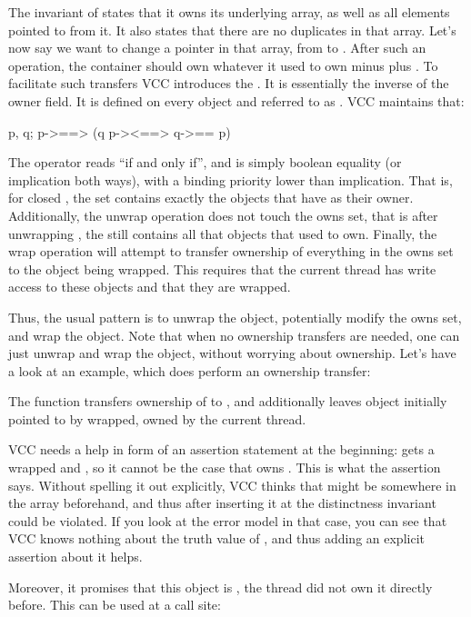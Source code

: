 
\noindent
The invariant of  states that it owns its underlying array,
as well as all elements pointed to from it.
It also states that there are no duplicates in that array.
Let's now say we want to change a pointer in that array,
from  to .
After such an operation, the container should own whatever it used
to own minus  plus .
To facilitate such transfers VCC introduces the .
It is essentially the inverse of the owner field.
It is defined on every object  and referred to as .
VCC maintains that:
\begin{VCC}
\forall \object p, q; p->\closed ==> 
  (q \in p->\owns <==> q->\owner == p)
\end{VCC}
The operator \vcc{<==>} reads ``if and only if'', and is simply boolean
equality (or implication both ways), with a binding priority lower than implication.
That is, for closed , the set  contains exactly
the objects that have  as their owner.
Additionally, the unwrap operation does not touch the owns set,
that is after unwrapping , the  still contains
all that objects that  used to own.
Finally, the wrap operation will attempt to transfer ownership
of everything in the owns set to the object being wrapped.
This requires that the current thread has write access to these objects
and that they are wrapped.

Thus, the usual pattern is to unwrap the object, potentially modify the owns
set, and wrap the object.
Note that when no ownership transfers are needed, one can just unwrap
and wrap the object, without worrying about ownership.
Let's have a look at an example, which does perform an ownership transfer:


\noindent
The  function transfers ownership of  to ,
and additionally leaves object initially pointed to by 
wrapped, \ie owned by the current thread.
\begin{note}
VCC needs a help in form of an assertion statement at the beginning:
 gets a wrapped  and , so it cannot be the
case that  owns . This is what the assertion says.
Without spelling it out explicitly, VCC thinks that  might be 
somewhere in the  array beforehand, and
thus after inserting it at  the distinctness invariant could be violated.
If you look at the error model in that case, you can
see that VCC knows nothing about the truth value of ,
and thus adding an explicit assertion about it helps.
\end{note}
Moreover, it promises that this object is , \ie the thread did not own
it directly before.
This can be used at a call site:

